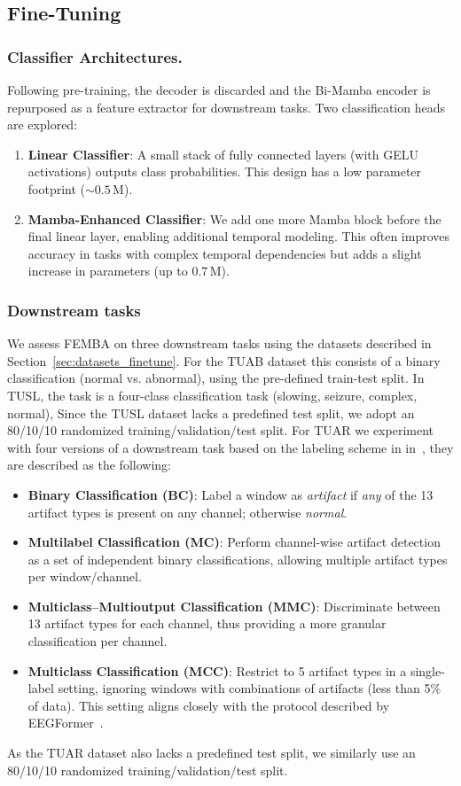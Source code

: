 \subsection{Fine-Tuning}
\label{subsec:fine-tuning}

\subsubsection{Classifier Architectures.}
Following pre-training, the decoder is discarded and the Bi-Mamba encoder is repurposed as a feature extractor for downstream tasks. Two classification heads are explored:
\begin{enumerate}
    \item \textbf{Linear Classifier}: A small stack of fully connected layers (with GELU activations) outputs class probabilities. This design has a low parameter footprint ($\sim 0.5$\,M).
    \item \textbf{Mamba-Enhanced Classifier}: We add one more Mamba block before the final linear layer, enabling additional temporal modeling. This often improves accuracy in tasks with complex temporal dependencies but adds a slight increase in parameters (up to $0.7$\,M).
\end{enumerate}
\subsubsection{Downstream tasks}
We assess FEMBA on three downstream tasks using the datasets described in Section~\ref{sec:datasets_finetune}. For the TUAB dataset this consists of a binary classification (normal vs. abnormal), using the pre-defined train-test split. In TUSL, the task is a four-class classification task (slowing, seizure, complex, normal), Since the TUSL dataset lacks a predefined test split, we adopt an 80/10/10 randomized training/validation/test split. For TUAR we experiment with four versions of a downstream task based on the labeling scheme in in~\cite{ingolfsson2022energy}, they are described as the following:
\begin{itemize}
    \item \textbf{Binary Classification (BC)}: Label a window as \emph{artifact} if \emph{any} of the 13 artifact types is present on any channel; otherwise \emph{normal}.
    \item \textbf{Multilabel Classification (MC)}: Perform channel-wise artifact detection as a set of independent binary classifications, allowing multiple artifact types per window/channel.
    \item \textbf{Multiclass--Multioutput Classification (MMC)}: Discriminate between 13 artifact types for each channel, thus providing a more granular classification per channel.
    \item \textbf{Multiclass Classification (MCC)}: Restrict to 5 artifact types in a single-label setting, ignoring windows with combinations of artifacts (less than 5\% of data). This setting aligns closely with the protocol described by EEGFormer~\cite{chen2024eegformer}.
\end{itemize}
As the TUAR dataset also lacks a predefined test split, we similarly use an 80/10/10 randomized training/validation/test split.
